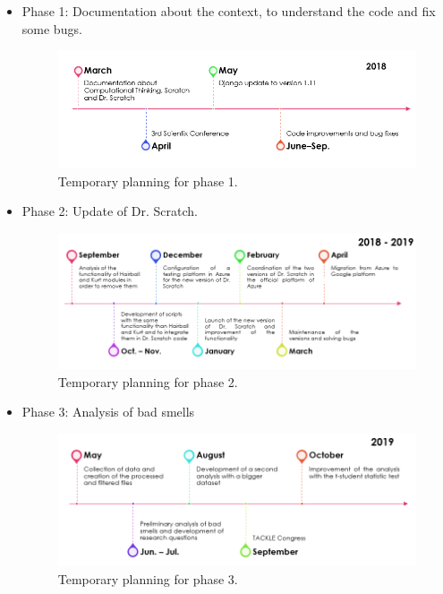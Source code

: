 \begin{itemize}
    \item Phase 1: Documentation about the context, to understand the code and fix some bugs.
    
    \begin{figure}[h]
    \centering
        \includegraphics[width=11cm, keepaspectratio]{img/phase_1.png}
        \caption{Temporary planning for phase 1.}
        \label{fig:phase_1}
    \end{figure}

    \item Phase 2: Update of Dr. Scratch.
    
    \begin{figure}[h]
    \centering
        \includegraphics[width=11cm, keepaspectratio]{img/phase_2.png}
        \caption{Temporary planning for phase 2.}
        \label{fig:phase_2}
    \end{figure}
    
    \item Phase 3: Analysis of bad smells
    
    \begin{figure}[h]
    \centering
        \includegraphics[width=11cm, keepaspectratio]{img/phase_3.png}
        \caption{Temporary planning for phase 3.}
        \label{fig:phase_3}
    \end{figure}
    

\end{itemize}
